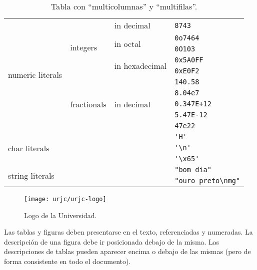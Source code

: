 \documentclass[twoside]{tfg-urjc}
\begin{document}
\begin{table}
  \centering

\begin{small}
\begin{tabular}{|l|l|l|l|}\hline
  \multirow{10}{*}{numeric literals} & \multirow{5}{*}{integers} & in decimal & \verb|8743| \\ \cline{3-4}
  & & \multirow{2}{*}{in octal} & \verb|0o7464| \\ \cline{4-4}
  & & & \verb|0O103| \\ \cline{3-4}
  & & \multirow{2}{*}{in hexadecimal} & \verb|0x5A0FF| \\ \cline{4-4}
  & & & \verb|0xE0F2| \\ \cline{2-4}
  & \multirow{5}{*}{fractionals} & \multirow{5}{*}{in decimal} & \verb|140.58| \\ \cline{4-4}
  & & & \verb|8.04e7| \\ \cline{4-4}
  & & & \verb|0.347E+12| \\ \cline{4-4}
  & & & \verb|5.47E-12| \\ \cline{4-4}
  & & & \verb|47e22| \\ \cline{1-4}
  \multicolumn{3}{|l|}{\multirow{3}{*}{char literals}} & \verb|'H'| \\ \cline{4-4}
  \multicolumn{3}{|l|}{} & \verb|'\n'| \\ \cline{4-4}          %
  \multicolumn{3}{|l|}{} & \verb|'\x65'| \\ \cline{1-4}        %
  \multicolumn{3}{|l|}{\multirow{2}{*}{string literals}} & \verb|"bom dia"| \\ \cline{4-4}
  \multicolumn{3}{|l|}{} & \verb|"ouro preto\nmg"| \\ \cline{1-4}          %
\end{tabular}
\end{small}

  \caption{Tabla con ``multicolumnas'' y ``multifilas''.}\label{tab:tablacompleja}
\end{table}





\begin{figure}
  \centering
  \texttt{[image: urjc/urjc-logo]}
  \caption{Logo de la Universidad.}
  \label{fig:logo_universidad}
\end{figure}

Las tablas y figuras deben presentarse en el texto, referenciadas y
numeradas. La descripción de una figura debe ir posicionada debajo de
la misma. Las descripciones de tablas pueden aparecer encima o debajo
de las mismas (pero de forma consistente en todo el documento).
\end{document}
